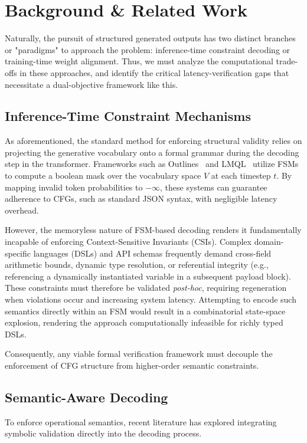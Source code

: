 \section{Background \& Related Work}
Naturally, the pursuit of structured generated outputs has two distinct branches
or "paradigms" to approach the problem: inference-time constraint decoding or
training-time weight alignment. Thus, we must analyze the computational
trade-offs in these approaches, and identify the critical latency-verification
gaps that necessitate a dual-objective framework like this.

  \subsection{Inference-Time Constraint Mechanisms}
  As aforementioned, the standard method for enforcing structural validity relies
  on projecting the generative vocabulary onto a formal grammar during the
  decoding step in the transformer. Frameworks such as Outlines~\cite{willard2023efficient} and
  LMQL~\cite{beurer2023prompting} utilize FSMs to compute a boolean mask over
  the vocabulary space $V$ at each timestep $t$. By mapping invalid token
  probabilities to $-\infty$, these systems can guarantee adherence to
  CFGs, such as standard JSON syntax, with negligible
  latency overhead.

  However, the memoryless nature of FSM-based decoding renders it fundamentally
  incapable of enforcing Context-Sensitive Invariants (CSIs). Complex
  domain-specific languages (DSLs) and API schemas frequently demand cross-field
  arithmetic bounds, dynamic type resolution, or referential integrity (e.g.,
  referencing a dynamically instantiated variable in a subsequent payload block).
  These constraints must therefore be validated \textit{post-hoc}, requiring
  regeneration when violations occur and increasing system latency. Attempting to
  encode such semantics directly within an FSM would result in a combinatorial
  state-space explosion, rendering the approach computationally infeasible for
  richly typed DSLs.

  Consequently, any viable formal verification framework must decouple the
  enforcement of CFG structure from higher-order semantic constraints.

  \subsection{Semantic-Aware Decoding}
  To enforce operational semantics, recent literature has explored integrating
  symbolic validation directly into the decoding process.

